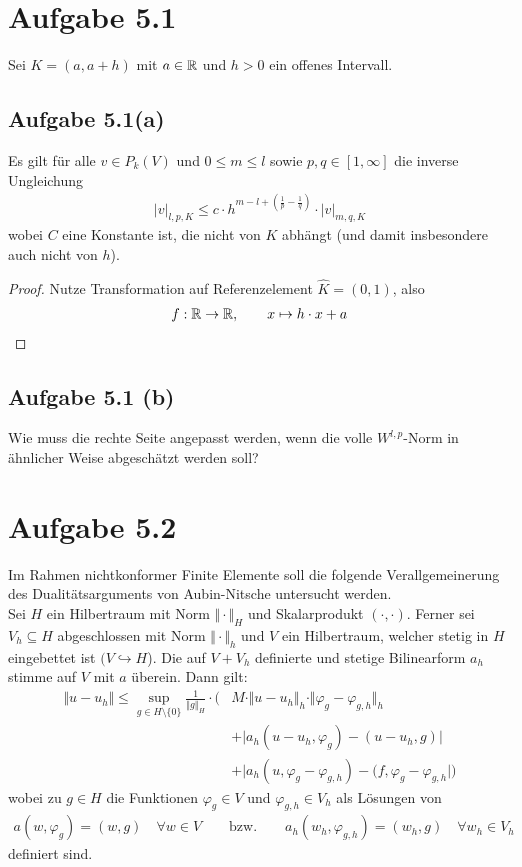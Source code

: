\documentclass[12pt,a4paper]{article}
\author{Willi Sontopski}
\begin{document}

\section*{Aufgabe 5.1}
Sei $K=(a,a+h)$ mit $a\in\mathbb{R}$ und $h>0$ ein offenes Intervall.

\subsection*{Aufgabe 5.1(a)}
Es gilt für alle $v\in P_k(V)$ und $0\leq m\leq l$ sowie $p,q\in[1,\infty]$ die inverse Ungleichung
\begin{align*}
|v|_{l,p,K}\leq c\cdot h^{m-l+\left(\frac{1}{p}-\frac{1}{q}\right)}\cdot|v|_{m,q,K}
\end{align*}
wobei $C$ eine Konstante ist, die nicht von $K$ abhängt (und damit insbesondere auch nicht von $h$).

\begin{proof}
Nutze Transformation auf Referenzelement $\hat{K}=(0,1)$, also
\begin{align*}
f:\mathbb{R}\to\mathbb{R},\qquad x\mapsto h\cdot x+a
\end{align*}
\end{proof}

\subsection*{Aufgabe 5.1 (b)}
Wie muss die rechte Seite angepasst werden, wenn die volle $W^{l,p}$-Norm in ähnlicher Weise abgeschätzt werden soll?

\begin{lösung}
\end{lösung}

\section*{Aufgabe 5.2}
Im Rahmen nichtkonformer Finite Elemente soll die folgende Verallgemeinerung des Dualitätsarguments von Aubin-Nitsche untersucht werden.\\
Sei $H$ ein Hilbertraum mit Norm $\Vert\cdot\Vert_H$ und Skalarprodukt $(\cdot,\cdot)$. Ferner sei $V_h\subseteq H$ abgeschlossen mit Norm $\Vert\cdot\Vert_h$ und $V$ ein Hilbertraum, welcher stetig in $H$ eingebettet ist $(V\hookrightarrow H$). Die auf $V+V_h$ definierte und stetige Bilinearform $a_h$ stimme auf $V$ mit $a$ überein. Dann gilt:
\begin{align*}
\Vert u-u_h\Vert\leq\sup\limits_{g\in H\setminus\lbrace0\rbrace}\frac{1}{\Vert g\Vert_H}\cdot\Big( &M\cdot\Vert u-u_h\Vert_h\cdot\Vert\varphi_g-\varphi_{g,h}\Vert_h\\
&+\big|a_h(u-u_h,\varphi_g)-(u-u_h,g)\big|\\
&+\big|a_h(u,\varphi_g-\varphi_{g,h})-(f,\varphi_g-\varphi_{g,h}\big|\Big)
\end{align*}
wobei zu $g\in H$ die Funktionen $\varphi_g\in V$ und $\varphi_{g,h}\in V_h$ als Lösungen von
\begin{align*}
a(w,\varphi_g)=(w,g)\quad\forall w\in V\qquad\text{bzw.}\qquad a_h(w_h,\varphi_{g,h})=(w_h,g)\quad\forall w_h\in V_h
\end{align*}
definiert sind.
\end{document}
